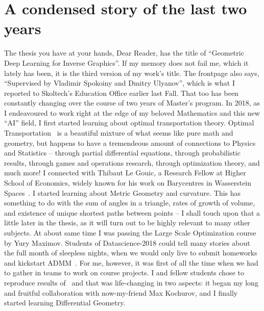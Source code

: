 \section*{A condensed story of the last two years}

The thesis you have at your hands, Dear Reader, has the title of ``Geometric
Deep Learning for Inverse Graphics''. If my memory does not fail me, which it
lately has been, it is the third version of my work's title. The frontpage also
says, ``Supervised by Vladimir Spokoiny and Dmitry Ulyanov'', which is what I
reported to Skoltech's Education Office earlier last Fall. That too has been
constantly changing over the course of two years of Master's program.  In 2018,
as I endeavoured to work right at the edge of my beloved Mathematics and this
new ``AI'' field, I first started learning about optimal transportation theory.
Optimal Transportation~\citep{villaniOldNew,ambrosioOTSummerSchool} is a
beautiful mixture of what seems like pure math and geometry, but happens to
have a tremendeous amount of connections to Physics and Statistics -- through
partial differential equations, through probabilistic results, through games
and operations research, through optimization theory, and much more! I
connected with Thibaut Le Gouic, a Research Fellow at Higher School of
Economics, widely known for his work on Barycentres in Wasserstein
Spaces~\citep{le2017existence}. I started learning about Metric Geometry and
curvature. This has something to do with the sum of angles in a triangle, rates
of growth of volume, and existence of unique shortest paths between points -- I
shall touch upon that a little later in the thesis, as it will turn out to be
highly relevant to many other subjects. At about same time I was passing the
Large Scale Optimization course by Yury Maximov. Students of Datascience-2018
could tell many stories about the full month of sleepless nights, when we would
only live to submit homeworks and kickstart ADMM~\citep{admmTweet,admmBoyd}.
For me, however, it was first of all the time when we had to gather in teams to work
on course projects. I and fellow students chose to reproduce results
of~\citet{acceleratingNatgrad} and that was life-changing in two aspects: it
began my long and fruitful collaboration with now-my-friend Max Kochurov, and I
finally started learning Differential Geometry.
